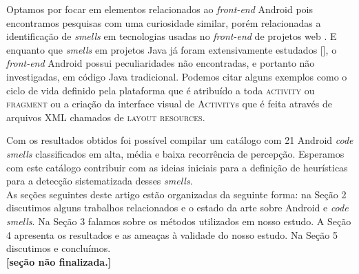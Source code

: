 Optamos por focar em elementos relacionados ao \textit{front-end} Android pois encontramos pesquisas com uma curiosidade similar, por\'em relacionadas a identifica\c{c}\~ao de \textit{smells} em tecnologias usadas no \textit{front-end} de projetos web \cite{CSSCodeSmell, BB, FinavaroAniche2016}. E enquanto que \textit{smells} em projetos Java j\'a foram extensivamente estudados [], o \textit{front-end} Android possui peculiaridades n\~ao encontradas, e portanto n\~ao investigadas, em c\'odigo Java tradicional. Podemos citar alguns exemplos como o ciclo de vida definido pela plataforma que \'e atribu\'ido a toda \textsc{activity} ou \textsc{fragment} ou a criação da interface visual de \textsc{Activity}s que \'e feita atrav\'es de arquivos XML chamados de \textsc{layout resources}.

Com os resultados obtidos foi poss\'ivel compilar um cat\'alogo com 21 Android \textit{code smells} classificados em alta, m\'edia e baixa recorr\^encia de percep\c{c}\~ao. Esperamos com este cat\'alogo contribuir com as ideias iniciais para a defini\c{c}\~ao de heur\'isticas para a detec\c{c}\~ao sistematizada desses \textit{smells}. \\

As se\c{c}\~oes seguintes deste artigo estão organizadas da seguinte forma: na Se\c{c}\~ao 2 discutimos alguns trabalhos relacionados e o estado da arte sobre Android e \textit{code smells}. Na Se\c{c}\~ao 3 falamos sobre os m\'etodos utilizados em nosso estudo. A Se\c{c}\~ao 4 apresenta os resultados e as amea\c{c}as \`a validade do nosso estudo. Na Se\c{c}\~ao 5 discutimos e conclu\'imos.\\ 

\textbf{[se\c{c}\~ao n\~ao finalizada.]}